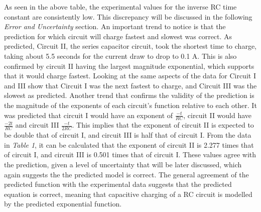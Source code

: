 \documentclass[12pt,letterpaper]{article}
\begin{document}
As seen in the above table, the experimental values for the inverse RC time constant are consistently low. This discrepancy will be discussed in the following \textit{Error and Uncertainty} section. An important trend to notice is that the prediction for which circuit will charge fastest and slowest was correct. As predicted, Circuit II, the series capacitor circuit, took the shortest time to charge, taking about 5.5 seconds for the current draw to drop to 0.1 A. This is also confirmed by circuit II having the largest magnitude exponential, which supports that it would charge fastest. Looking at the same aspects of the data for Circuit I and III show that Circuit I was the next fastest to charge, and Circuit III was the slowest as predicted. Another trend that confirms the validity of the prediction is the magnitude of the exponents of each circuit's function relative to each other. It was predicted that circuit I would have an exponent of $\frac{-t}{RC}$, circuit II would have $\frac{-2t}{RC}$ and circuit III $\frac{-t}{2RC}$. This implies that the exponent of circuit II is expected to be double that of circuit I, and circuit III is half that of circuit I. From the data in \textit{Table 1}, it can be calculated that the exponent of circuit II is 2.277 times that of circuit I, and circuit III is 0.501 times that of circuit I. These values agree with the prediction, given a level of uncertainty that will be later discussed, which again suggests the the predicted model is correct. The general agreement of the predicted function with the experimental data suggests that the predicted equation is correct, meaning that capacitive charging of a RC circuit is modelled by the predicted exponential function.
\end{document}

